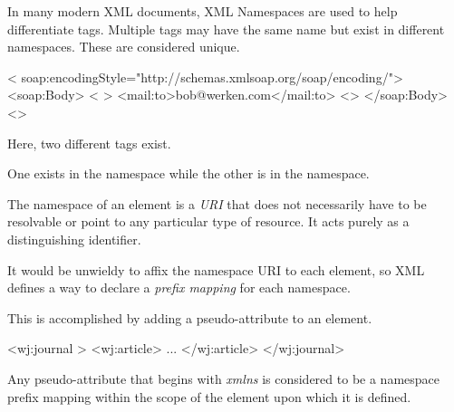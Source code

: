\documentclass[20pt,landscape,headrule,footrule]{foils}
\begin{document}

In many modern XML documents, XML Namespaces are used to help
differentiate tags.  Multiple tags may have the same name but
exist in different namespaces.  These are considered unique.

\begin{codelisting}
<
  soap:encodingStyle="http://schemas.xmlsoap.org/soap/encoding/">
   <soap:Body>
       < 
         >
         <mail:to>bob@werken.com</mail:to> 
       <>
   </soap:Body>
<>
\end{codelisting}

Here, two different  tags exist.  

One exists in the
 namespace
while
the other is in the 
namespace.



The namespace of an element is a \emph{URI} that does not necessarily
have to be resolvable or point to any particular type of resource.  It
acts purely as a distinguishing identifier.

It would be unwieldy to affix the namespace URI to each element, so
XML defines a way to declare a \emph{prefix mapping} for each
namespace.

This is accomplished by adding a pseudo-attribute to an element.

\begin{codelisting}
<wj:journal >
  <wj:article>
    ...
  </wj:article>
</wj:journal>
\end{codelisting}

Any pseudo-attribute that begins with \emph{xmlns} is considered
to be a namespace prefix mapping within the scope of the element
upon which it is defined.


\end{document}

